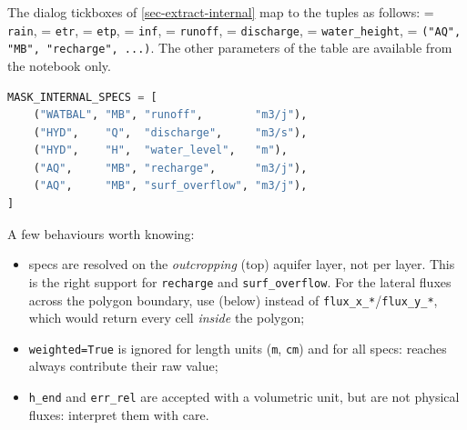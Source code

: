 The dialog tickboxes of \cref{sec-extract-internal} map to the tuples as follows:  = \texttt{rain},  = \texttt{etr},  = \texttt{etp},  = \texttt{inf},  = \texttt{runoff},  = \texttt{discharge},  = \texttt{water\_height},  = \texttt{("AQ", "MB", "recharge", ...)}. The other parameters of the table are available from the notebook only.

\begin{lstlisting}[language=Python,caption={Example of \texttt{specs} for \script{mask\_internal\_values}.}]
MASK_INTERNAL_SPECS = [
    ("WATBAL", "MB", "runoff",        "m3/j"),
    ("HYD",    "Q",  "discharge",     "m3/s"),
    ("HYD",    "H",  "water_level",   "m"),
    ("AQ",     "MB", "recharge",      "m3/j"),
    ("AQ",     "MB", "surf_overflow", "m3/j"),
]
\end{lstlisting}


A few behaviours worth knowing:
\begin{itemize}
    \item {} specs are resolved on the \emph{outcropping} (top) aquifer layer, not per layer. This is the right support for \texttt{recharge} and \texttt{surf\_overflow}. For the lateral fluxes across the polygon boundary, use  (below) instead of \texttt{flux\_x\_*}/\texttt{flux\_y\_*}, which would return every cell \emph{inside} the polygon;
    \item \texttt{weighted=True} is ignored for length units (\texttt{m}, \texttt{cm}) and for all  specs: reaches always contribute their raw value;
    \item \texttt{h\_end} and \texttt{err\_rel} are accepted with a volumetric unit, but are not physical fluxes: interpret them with care.
\end{itemize}

